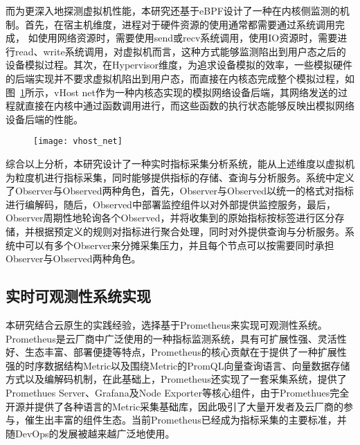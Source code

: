 而为更深入地探测虚拟机性能，本研究还基于eBPF设计了一种在内核侧监测的机制。首先，在宿主机维度，进程对于硬件资源的使用通常都需要通过系统调用完成， 如使用网络资源时，需要使用send或recv系统调用，使用IO资源时，需要进行read、write系统调用，对虚拟机而言，这种方式能够监测陷出到用户态之后的设备模拟过程。其次，在Hypervisor维度，为追求设备模拟的效率，一些模拟硬件的后端实现并不要求虚拟机陷出到用户态，而直接在内核态完成整个模拟过程，如图~\ref{fig:vhost_net}所示，vHost net作为一种内核态实现的模拟网络设备后端，其网络发送的过程就直接在内核中通过函数调用进行，而这些函数的执行状态能够反映出模拟网络设备后端的性能。

\begin{figure}[!htbp]
    \centering
    \texttt{[image: vhost\_net]}
    \label{fig:vhost_net}
\end{figure}

综合以上分析，本研究设计了一种实时指标采集分析系统，能从上述维度以虚拟机为粒度机进行指标采集，同时能够提供指标的存储、查询与分析服务。系统中定义了Observer与Observed两种角色，首先，Observer与Observed以统一的格式对指标进行编解码，随后，Observed中部署监控组件以对外部提供监控服务，最后，Observer周期性地轮询各个Observed，并将收集到的原始指标按标签进行区分存储，并根据预定义的规则对指标进行聚合处理，同时对外提供查询与分析服务。系统中可以有多个Observer来分摊采集压力，并且每个节点可以按需要同时承担Observer与Observed两种角色。

\subsection{实时可观测性系统实现}


本研究结合云原生的实践经验，选择基于Prometheus来实现可观测性系统。Prometheus\citep{prometheus}是云厂商中广泛使用的一种指标监测系统，具有可扩展性强、灵活性好、生态丰富、部署便捷等特点，Prometheus的核心贡献在于提供了一种扩展性强的时序数据结构Metric以及围绕Metric的PromQL向量查询语言、向量数据存储方式以及编解码机制，在此基础上，Prometheus还实现了一套采集系统，提供了Promethues Server、Grafana及Node Exporter等核心组件，由于Promethues完全开源并提供了各种语言的Metric采集基础库，因此吸引了大量开发者及云厂商的参与，催生出丰富的组件生态。当前Prometheus已经成为指标采集的主要标准，并随DevOps的发展被越来越广泛地使用。

